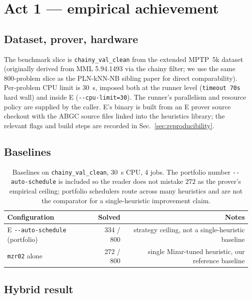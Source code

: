 \documentclass[11pt]{article}
\newcommand{\lpath}[1]{\texttt{\nolinkurl{#1}}}
\newcommand{\lid}[1]{{\ttfamily\nolinkurl{#1}}}
\begin{document}
\section{Act 1 --- empirical achievement}\label{sec:act1}

\subsection{Dataset, prover, hardware}\label{sec:setup}

The benchmark slice is \lpath{chainy_val_clean} from the
extended MPTP~5k dataset (originally derived from MML 5.94.1493 via the
chainy filter; we use the same 800-problem slice as the PLN-kNN-NB
sibling paper for direct comparability). Per-problem CPU limit is $30$~s,
imposed both at the runner level (\lid{timeout 70s} hard wall) and inside
E (\lid{--cpu-limit=30}). The runner's parallelism and resource policy are
supplied by the caller. E's binary is built from an E prover source checkout
with the ABGC source files linked into
the heuristics library; the relevant flags and build steps are recorded in
Sec.~\ref{sec:reproducibility}.

\subsection{Baselines}\label{sec:baselines}

\begin{table}[t]
\centering
\begin{tabular}{lrr}
\toprule
Configuration & Solved & Notes \\
\midrule
E \lid{--auto-schedule} (portfolio) & 334 / 800 & strategy ceiling, not a single-heuristic baseline \\
\texttt{mzr02} alone & 272 / 800 & single Mizar-tuned heuristic, our reference baseline \\
\bottomrule
\end{tabular}
\caption{Baselines on \lpath{chainy_val_clean}, 30~s CPU, 4 jobs.
The portfolio number \lid{--auto-schedule} is included so the reader does
not mistake $272$ as the prover's empirical ceiling; portfolio
schedulers route across many heuristics and are not the comparator for a
single-heuristic improvement claim.}
\label{tab:baselines}
\end{table}

\subsection{Hybrid result}\label{sec:hybrid}
\end{document}
